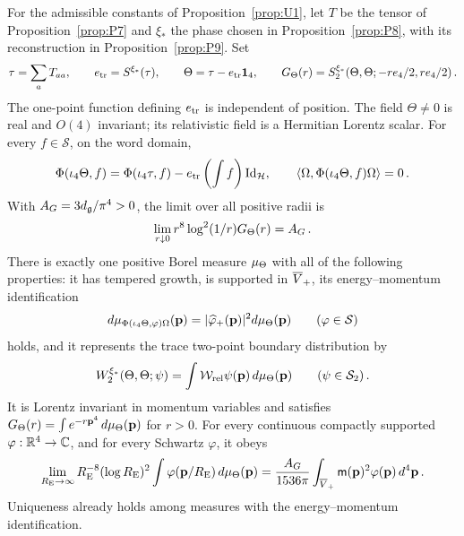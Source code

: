 \begin{proposition}\label{prop:P10}
For the admissible constants of Proposition~\ref{prop:U1}, let $T$ be the tensor of Proposition~\ref{prop:P7} and $\xi_*$ the phase chosen in Proposition~\ref{prop:P8}, with its reconstruction in Proposition~\ref{prop:P9}. Set
\begin{equation}\label{eq:P10-1}
\tau=\sum_aT_{aa},\qquad e_{\rm tr}=S^{\xi_*}(\tau),\qquad \Theta=\tau-e_{\rm tr}\mathbf{1}_{4},\qquad G_{\Theta}(r)=S_2^{\xi_*}(\Theta,\Theta;-re_4/2,re_4/2)\,.
\end{equation}
The one-point function defining $e_{\rm tr}$ is independent of position. The field $\Theta\ne0$ is real and $O(4)$ invariant; its relativistic field is a Hermitian Lorentz scalar. For every $f\in\mathcal S$, on the word domain,
\begin{equation}\label{eq:P10-2}
\Phi(\iota_4\Theta,f)=\Phi(\iota_4\tau,f)-e_{\rm tr}\left(\int f\right)\mathrm{Id}_{\mathcal H},\qquad
\langle\Omega,\Phi(\iota_4\Theta,f)\Omega\rangle=0\,.
\end{equation}
With $A_G=3d_{\mathfrak{g}}/\pi^4>0$, the limit over all positive radii is
\begin{equation}\label{eq:P10-3}
\lim_{r\downarrow0}r^8\log^2(1/r)G_{\Theta}(r)=A_G\,.
\end{equation}
There is exactly one positive Borel measure $\mu_{\Theta}$ with all of the following properties: it has tempered growth, is supported in $\overline{V}_+$, its energy–momentum identification
\begin{equation}\label{eq:P10-4}
d\mu_{\Phi(\iota_4\Theta,\varphi)\Omega}(\mathbf p)=|\widehat{\varphi}_{+}(\mathbf p)|^2d\mu_{\Theta}(\mathbf p)\qquad(\varphi\in\mathcal S)
\end{equation}
holds, and it represents the trace two-point boundary distribution by
\begin{equation}\label{eq:P10-5}
W_2^{\xi_*}(\Theta,\Theta;\psi)=\int\mathcal{W}_{\mathrm{rel}}\psi(\mathbf p)\,d\mu_{\Theta}(\mathbf p)\qquad(\psi\in\mathcal S_2)\,.
\end{equation}
It is Lorentz invariant in momentum variables and satisfies $G_{\Theta}(r)=\int e^{-r\mathbf p^4}\,d\mu_{\Theta}(\mathbf p)$ for $r>0$. For every continuous compactly supported $\varphi:\mathbb{R}^4\to\mathbb{C}$, and for every Schwartz $\varphi$, it obeys
\begin{equation}\label{eq:P10-6}
\lim_{R_{\rm E}\to\infty}R_{\rm E}^{-8}(\log R_{\rm E})^2\int\varphi(\mathbf p/R_{\rm E})\,d\mu_{\Theta}(\mathbf p)
=\frac{A_G}{1536\pi}\int_{\overline{V}_+}\mathsf{m}(\mathbf p)^2\varphi(\mathbf p)\,d^4\mathbf p\,.
\end{equation}
Uniqueness already holds among measures with the energy–momentum identification.
\end{proposition}

